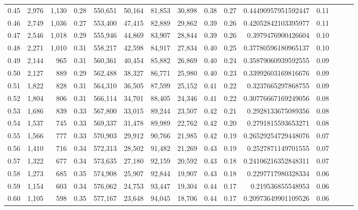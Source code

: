 \begin{tabular}{rrrrrrrrrrrrrrr}
0.45 &   2,976 &  1,130 &  0.28 &  550,651 &   50,164 &   81,853 &   30,898 &  0.38 &  0.27 &   0.44490957951592447 &      0.11 \\
0.46 &   2,749 &  1,036 &  0.27 &  553,400 &   47,415 &   82,889 &   29,862 &  0.39 &  0.26 &   0.42052842103395977 &      0.11 \\
0.47 &   2,546 &  1,018 &  0.29 &  555,946 &   44,869 &   83,907 &   28,844 &  0.39 &  0.26 &    0.3979476900426604 &      0.10 \\
0.48 &   2,271 &  1,010 &  0.31 &  558,217 &   42,598 &   84,917 &   27,834 &  0.40 &  0.25 &   0.37780596180965137 &      0.10 \\
0.49 &   2,144 &    965 &  0.31 &  560,361 &   40,454 &   85,882 &   26,869 &  0.40 &  0.24 &   0.35879060939592555 &      0.09 \\
0.50 &   2,127 &    889 &  0.29 &  562,488 &   38,327 &   86,771 &   25,980 &  0.40 &  0.23 &   0.33992603169816676 &      0.09 \\
0.51 &   1,822 &    828 &  0.31 &  564,310 &   36,505 &   87,599 &   25,152 &  0.41 &  0.22 &    0.3237665297868755 &      0.09 \\
0.52 &   1,804 &    806 &  0.31 &  566,114 &   34,701 &   88,405 &   24,346 &  0.41 &  0.22 &   0.30776667169249056 &      0.08 \\
0.53 &   1,686 &    839 &  0.33 &  567,800 &   33,015 &   89,244 &   23,507 &  0.42 &  0.21 &    0.2928133675089356 &      0.08 \\
0.54 &   1,537 &    745 &  0.33 &  569,337 &   31,478 &   89,989 &   22,762 &  0.42 &  0.20 &    0.2791815593653271 &      0.08 \\
0.55 &   1,566 &    777 &  0.33 &  570,903 &   29,912 &   90,766 &   21,985 &  0.42 &  0.19 &   0.26529254729448076 &      0.07 \\
0.56 &   1,410 &    716 &  0.34 &  572,313 &   28,502 &   91,482 &   21,269 &  0.43 &  0.19 &    0.2527871149701555 &      0.07 \\
0.57 &   1,322 &    677 &  0.34 &  573,635 &   27,180 &   92,159 &   20,592 &  0.43 &  0.18 &   0.24106216352848311 &      0.07 \\
0.58 &   1,273 &    685 &  0.35 &  574,908 &   25,907 &   92,844 &   19,907 &  0.43 &  0.18 &    0.2297717980328334 &      0.06 \\
0.59 &   1,154 &    603 &  0.34 &  576,062 &   24,753 &   93,447 &   19,304 &  0.44 &  0.17 &     0.219536855548953 &      0.06 \\
0.60 &   1,105 &    598 &  0.35 &  577,167 &   23,648 &   94,045 &   18,706 &  0.44 &  0.17 &   0.20973649901109526 &      0.06 \\

\end{tabular}
